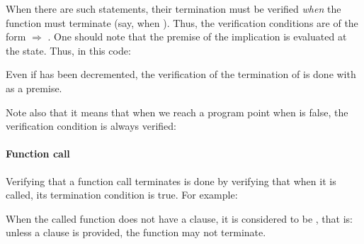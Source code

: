 


When there are such statements, their termination must be verified {\em when}
the function must terminate (say, when ). Thus, the verification
conditions are of the form
 $\Rightarrow$ .
One should note that the premise of the implication is evaluated at the
 state. Thus, in this code:






Even if  has been decremented, the verification of the
termination of  is done with  as a
premise.



Note also that it means that when we reach a program point when 
is false, the verification condition is always verified:






\paragraph{Function call}



Verifying that a function call terminates is done by verifying that when it is
called, its termination condition is true. For example:









When the called function does not have a  clause, it
is considered to be , that is: unless a
 clause is provided, the function may not terminate.




